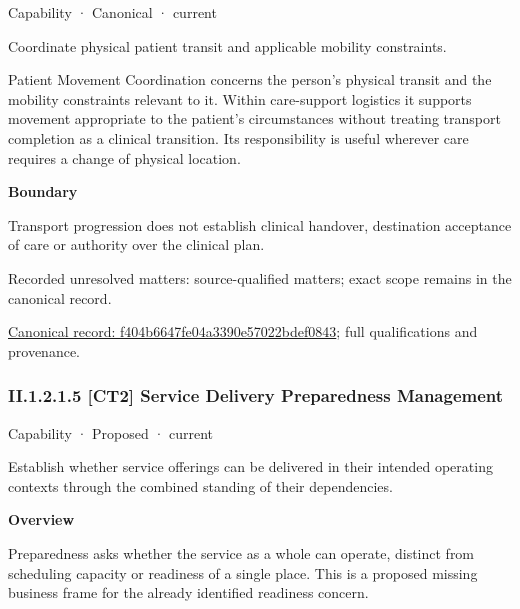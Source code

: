 \label{element:f404b6647fe04a3390e57022bdef0843}
{\small Capability · Canonical · current}\par

Coordinate physical patient transit and applicable mobility constraints.



Patient Movement Coordination concerns the person's physical transit and the mobility constraints relevant to it. Within care-support logistics it supports movement appropriate to the patient's circumstances without treating transport completion as a clinical transition. Its responsibility is useful wherever care requires a change of physical location.



\textbf{Boundary}



Transport progression does not establish clinical handover, destination acceptance of care or authority over the clinical plan.


{\small Recorded unresolved matters: source-qualified matters; exact scope remains in the canonical record.}\par
{\footnotesize \href{../../../../../../../continuum/strategy/capability/f404b6647fe04a3390e57022bdef0843.md}{Canonical record: f404b6647fe04a3390e57022bdef0843}; full qualifications and provenance.}\par
\subsubsection*{II.1.2.1.5 [CT2] Service Delivery Preparedness Management}
\label{navigation:II.1.2.1.5}

\label{element:9665d894c4c9438999d8cc10afae695d}
{\small Capability · Proposed · current}\par

Establish whether service offerings can be delivered in their intended operating contexts through the combined standing of their dependencies.



\textbf{Overview}



Preparedness asks whether the service as a whole can operate, distinct from scheduling capacity or readiness of a single place. This is a proposed missing business frame for the already identified readiness concern.



